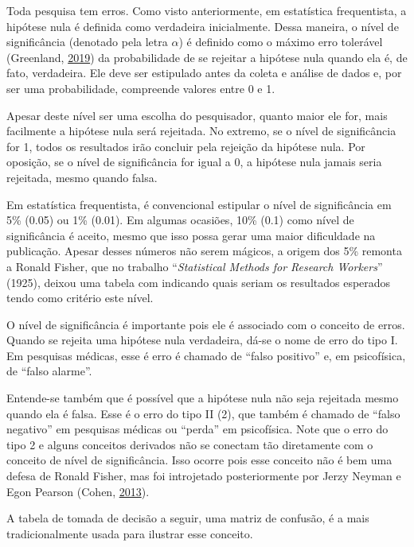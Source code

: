 \documentclass[
]{book}
\begin{document}
Toda pesquisa tem erros. Como visto anteriormente, em estatística
frequentista, a hipótese nula é definida como verdadeira inicialmente.
Dessa maneira, o nível de significância (denotado pela letra \(\alpha\))
é definido como o máximo erro tolerável (Greenland,
\protect\hyperlink{ref-Greenland2019}{2019}) da probabilidade de se
rejeitar a hipótese nula quando ela é, de fato, verdadeira. Ele deve ser
estipulado antes da coleta e análise de dados e, por ser uma
probabilidade, compreende valores entre 0 e 1.

Apesar deste nível ser uma escolha do pesquisador, quanto maior ele for,
mais facilmente a hipótese nula será rejeitada. No extremo, se o nível
de significância for 1, todos os resultados irão concluir pela rejeição
da hipótese nula. Por oposição, se o nível de significância for igual a
0, a hipótese nula jamais seria rejeitada, mesmo quando falsa.

Em estatística frequentista, é convencional estipular o nível de
significância em 5\% (0.05) ou 1\% (0.01). Em algumas ocasiões, 10\%
(0.1) como nível de significância é aceito, mesmo que isso possa gerar
uma maior dificuldade na publicação. Apesar desses números não serem
mágicos, a origem dos 5\% remonta a Ronald Fisher, que no trabalho
``\emph{Statistical Methods for Research Workers}'' (1925), deixou uma
tabela com indicando quais seriam os resultados esperados tendo como
critério este nível.

O nível de significância é importante pois ele é associado com o
conceito de erros. Quando se rejeita uma hipótese nula verdadeira, dá-se
o nome de erro do tipo I. Em pesquisas médicas, esse é erro é chamado de
``falso positivo'' e, em psicofísica, de ``falso alarme''.

Entende-se também que é possível que a hipótese nula não seja rejeitada
mesmo quando ela é falsa. Esse é o erro do tipo II (2), que também é
chamado de ``falso negativo'' em pesquisas médicas ou ``perda'' em
psicofísica. Note que o erro do tipo 2 e alguns conceitos derivados não
se conectam tão diretamente com o conceito de nível de significância.
Isso ocorre pois esse conceito não é bem uma defesa de Ronald Fisher,
mas foi introjetado posteriormente por Jerzy Neyman e Egon Pearson
(Cohen, \protect\hyperlink{ref-cohen2013explaining}{2013}).

A tabela de tomada de decisão a seguir, uma matriz de confusão, é a mais
tradicionalmente usada para ilustrar esse conceito.
\end{document}
